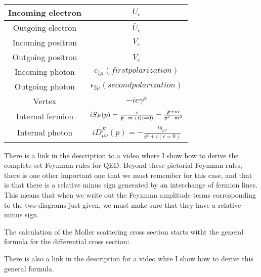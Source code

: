 \documentclass[a4]{article}
\begin{document}
    \begin{center}
        \begin{tabular}[center]{|c|c|}
            \hline
            Incoming electron & $U_{e}$ \\
            \hline
            Outgoing electron & $\overline{U}_{e}$ \\
            \hline
            Incoming positron & $V_{e}$ \\
            \hline
            Outgoing positron & $\overline{V}_{e}$ \\
            \hline
            Incoming photon & $\epsilon_{1 \mu} (first polarization)$ \\
            \hline
            Outgoing photon & $\epsilon_{2 \mu} (second polarization)$ \\
            \hline
            Vertex & $-i e \gamma^{\mu}$ \\
            \hline
            Internal fermion & $i S_{F} (p) = \frac{i}{\slashed{p} - m + i (\epsilon = 0)} = \frac{\slashed{p} + m}{p^2 - m^2}$ \\
            \hline
            Internal photon & $i D^{F}_{\mu \nu} (p) = - \frac{i g_{\mu \nu}}{q^2 + i(\epsilon = 0)}$ \\
            \hline
        \end{tabular}
    \end{center}

    There is a link in the description to a video where I show how to derive the complete set Feynman rules for QED. Beyond these pictorial Feynman rules, there is one other important one that
    we must remember for this case, and that is that there is a relative minus sign generated by an interchange of fermion lines. This means that when we write out the Feynman amplitude terms 
    corresponding  to the two diagrams just given, we must make sure that they have a relative minus sign. 

    The calculation of the Moller scattering cross section starts witht the general formula for the differential cross section:

    \begin{center}
    \end{center}

    There is also a link in the description for a video whre I show how to derive this general formula.
\end{document}
